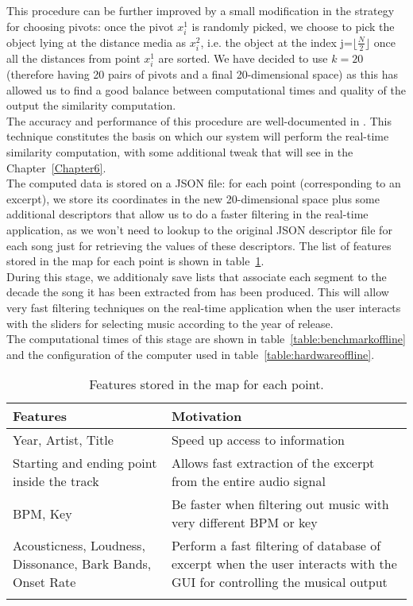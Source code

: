This procedure can be further improved by a small modification in the strategy for choosing pivots: once the pivot $x_i^1$ is randomly picked, we choose to pick the object lying at the distance media as $x_i^2$, i.e. the object at the index j=$ \lfloor \frac{N}{2} \rfloor$ once all the distances from point $x_i^1$ are sorted. We have decided to use $k=20$ (therefore having 20 pairs of pivots and a final 20-dimensional space) as this has allowed us to find a good balance between computational times and quality of the output the similarity computation.\\
The accuracy and performance of this procedure are well-documented in \cite{fastmap12}. This technique constitutes the basis on which our system will perform the real-time similarity computation, with some additional tweak that will see in the Chapter~\ref{Chapter6}. \\
The computed data is stored on a JSON file: for each point (corresponding to an excerpt), we store its coordinates in the new 20-dimensional space plus some additional descriptors that allow us to do a faster filtering in the real-time application, as we won't need to lookup to the original JSON descriptor file for each song just for retrieving the values of these descriptors. The list of features stored in the map for each point is shown in table~\ref{table:fastmap}.\\During this stage, we additionaly save lists that associate each segment to the decade the song it has been extracted from has been produced. This will allow very fast filtering techniques on the real-time application when the user interacts with the sliders for selecting music according to the year of release. \\The computational times of this stage are shown in table~\ref{table:benchmarkoffline} and the configuration of the computer used in table~\ref{table:hardwareoffline}.


\begin{center}
\begin{longtable}{ p{}  p{} } 
\textbf{Features} &  \textbf{Motivation} \\ \toprule
Year, Artist, Title & Speed up access to information\\ \midrule
Starting and ending point inside the track & Allows fast extraction of the excerpt from the entire audio signal \\ \midrule
BPM, Key & Be faster when filtering out music with very different BPM or key\\ \midrule
Acousticness, Loudness, Dissonance, Bark Bands, Onset Rate & Perform a fast filtering of database of excerpt when the user interacts with the GUI for controlling the musical output\\ \bottomrule
\caption[Features stored in the map]{Features stored in the map for each point.}
\label{table:fastmap}
\end{longtable}
\end{center}

